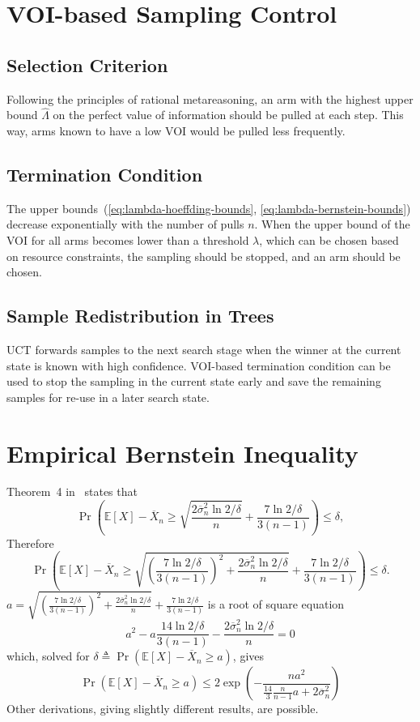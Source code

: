 \documentclass{article}
\newcommand {\IE} {\ensuremath {\mathbb{E}}}
\begin{document}
\section{VOI-based Sampling Control}

\subsection{Selection Criterion}

Following the principles of rational metareasoning, an arm with the highest upper bound $\hat
\Lambda$ on the perfect value of information should be pulled at each
step. This way, arms known to have a low VOI  would be pulled less frequently.

\subsection{Termination Condition}

The upper bounds~(\ref{eq:lambda-hoeffding-bounds}, \ref{eq:lambda-bernstein-bounds}) decrease exponentially with the
number of pulls $n$. When the upper bound of the VOI for all arms
becomes lower than a threshold $\lambda$, which can be chosen based on
resource constraints, the sampling should be stopped, and an arm should
be chosen.

\subsection{Sample Redistribution in Trees}

UCT forwards samples to the next search stage when the winner at the
current state is known with high confidence. VOI-based termination
condition can be used to stop the sampling in the current state early
and save the remaining samples for re-use in a later search state.

\clearpage

\appendix

\section{Empirical Bernstein Inequality}
\label{app:deriv-conc-empbernstein}

Theorem~4 in~\cite{MaurerPontil.benrstein} states that
\[\Pr\left(\IE[X]-\overline X_n \ge \sqrt { \frac {2\overline\sigma_n^2 \ln 2/\delta} n } + \frac {7 \ln 2/\delta} {3(n-1)}\right)\le \delta,\]
Therefore
\[\Pr\left(\IE[X]-\overline X_n \ge \sqrt { \left(\frac {7 \ln 2/\delta} {3(n-1)}\right)^2+\frac {2\overline\sigma_n^2 \ln 2/\delta} n } + \frac {7 \ln 2/\delta} {3(n-1)}\right)\le
\delta.\]
$a=\sqrt { \left(\frac {7 \ln 2/\delta} {3(n-1)}\right)^2+\frac {2\overline\sigma_n^2 \ln 2/\delta} n } + \frac {7 \ln 2/\delta} {3(n-1)}$ is a root of
square equation
\[a^2-a\frac {14 \ln 2/\delta} {3(n-1)} -\frac {2\overline\sigma_n^2 \ln 2/\delta} n=0\]
which, solved for $\delta\triangleq\Pr(\IE[X]-\overline X_n\ge a)$,
gives
\[\Pr(\IE[X]-\overline X_n\ge a)\le 2\exp \left( - \frac {na^2} {\frac {14} {3} \frac {n} {n-1}a+2\overline\sigma_n^2}\right)\]
Other derivations, giving slightly different results, are possible.
\end{document}
